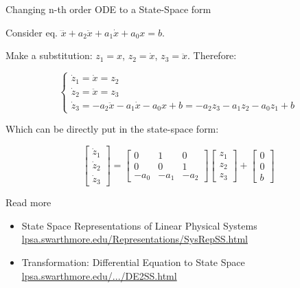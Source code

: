\documentclass{beamer}
\begin{document}
\begin{frame}{Changing n-th order ODE to a State-Space form}
\begin{flushleft}

Consider eq. $\dddot{x} + a_2 \ddot{x} + a_1 \dot{x} + a_0 x = b$.

\bigskip

Make a substitution: $z_1 = x$, $z_2 = \dot{x}$, $z_3 = \ddot{x}$. Therefore:

\begin{equation}
    \begin{cases}
        \dot{z}_1 = \dot{x} = z_2 \\
        \dot{z}_2 = \ddot{x} = z_3 \\
        \dot{z}_3 =  -a_2 \ddot{x} - a_1 \dot{x} - a_0 x + b = 
        -a_2 z_3 - a_1 z_2 - a_0 z_1 + b
    \end{cases}
\end{equation}

Which can be directly put in the state-space form:

\begin{equation}
\begin{bmatrix}
\dot{z}_1 \\ \dot{z}_2 \\ \dot{z}_3
\end{bmatrix} 
=
\begin{bmatrix}
0 & 1 & 0 \\ 
0 & 0 & 1 \\
-a_0 & -a_1 & -a_2
\end{bmatrix} 
\begin{bmatrix}
z_1 \\ z_2 \\ z_3
\end{bmatrix} 
+ 
\begin{bmatrix}
0 \\ 0 \\ b
\end{bmatrix}
\end{equation}


\end{flushleft}
\end{frame}




\begin{frame}{Read more}

\begin{itemize}
\item State Space Representations of Linear Physical Systems \href{https://lpsa.swarthmore.edu/Representations/SysRepSS.html}{lpsa.swarthmore.edu/Representations/SysRepSS.html}

\item Transformation: Differential Equation to State Space \href{https://lpsa.swarthmore.edu/Representations/SysRepTransformations/DE2SS.html}{lpsa.swarthmore.edu/.../DE2SS.html}
\end{itemize}

\end{frame}
\end{document}
